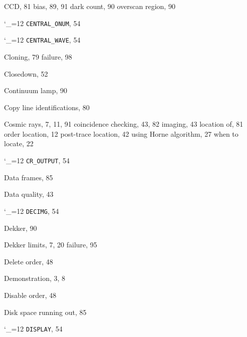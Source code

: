 \documentclass[11pt,twoside]{article}
\newcommand{\cmdname}{\begingroup \catcode`\_=12 \realcmdname}
\newcommand{\realcmdname}[1]{\endgroup\texttt{#1}}
\begin{document}
\begin{theindex}
  \indexspace

  \item CCD, 81
    \subitem bias, 89, 91
    \subitem dark count, 90
    \subitem overscan region, 90
  \item \cmdname {CENTRAL_ONUM}, 54
  \item \cmdname {CENTRAL_WAVE}, 54
  \item Cloning, 79
    \subitem failure, 98
  \item Closedown, 52
  \item Continuum lamp, 90
  \item Copy line identifications, 80
  \item Cosmic rays, 7, 11, 91
    \subitem coincidence checking, 43, 82
    \subitem imaging, 43
    \subitem location of, 81
    \subitem order location, 12
    \subitem post-trace location, 42
    \subitem using Horne algorithm, 27
    \subitem when to locate, 22
  \item \cmdname {CR_OUTPUT}, 54

  \indexspace

  \item Data frames, 85
  \item Data quality, 43
  \item \cmdname {DECIMG}, 54
  \item Dekker, 90
  \item Dekker limits, 7, 20
    \subitem failure, 95
  \item Delete order, 48
  \item Demonstration, 3, 8
  \item Disable order, 48
  \item Disk space
    \subitem running out, 85
  \item \cmdname {DISPLAY}, 54

  \indexspace


\end{theindex}
\end{document}
